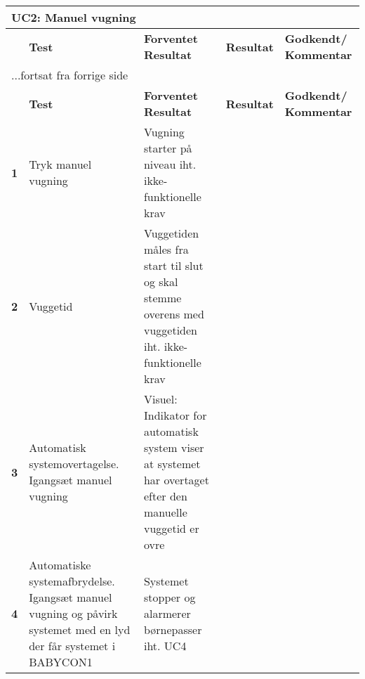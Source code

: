 \begin{center}
	\label{accepttest:uc2} 
\begin{longtable}{|p{}|p{}|p{}|p{}|p{}|} %
\hline
\multicolumn{5}{|l|}{\textbf{UC2: Manuel vugning}} \\ \hline
\multicolumn{1}{|c|}{} &
\textbf{Test} &
\textbf{Forventet \newline Resultat} &
\textbf{Resultat} &
\textbf{Godkendt/ \newline Kommentar} \\ \hline 
\endfirsthead

\multicolumn{5}{l}{...fortsat fra forrige side} \\ \hline 
\multicolumn{1}{|c|}{} &
\textbf{Test} &
\textbf{Forventet \newline Resultat} &
\textbf{Resultat} &
\textbf{Godkendt/ \newline Kommentar} \\ \hline 
\endhead



\textbf{1}	&Tryk manuel vugning
			&Vugning starter på niveau iht. ikke-funktionelle krav
			&
			&
			\\\hline

\textbf{2}	&Vuggetid
			&Vuggetiden måles fra start til slut og skal stemme 
			 overens med vuggetiden iht. ikke-funktionelle krav 
			&
			& 
			\\\hline
			 
\textbf{3}	&Automatisk systemovertagelse. Igangsæt manuel vugning
			&Visuel: Indikator for automatisk system viser at 
			 systemet har overtaget efter den manuelle vuggetid er ovre
			&
			&
			\\\hline

\textbf{4}	&Automatiske systemafbrydelse. Igangsæt manuel vugning 
  			 og påvirk systemet med en lyd der får systemet i BABYCON1
			&Systemet stopper og alarmerer børnepasser iht. UC4
			&
			&
			\\\hline

\end{longtable}
\end{center}
